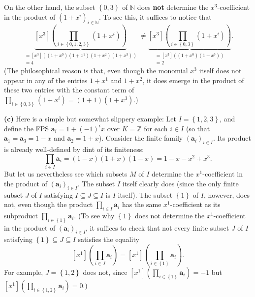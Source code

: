 \begin{example}
On the other hand, the subset $\left\{  0,3\right\}  $ of $\mathbb{N}$ does
\textbf{not} determine the $x^{3}$-coefficient in the product of $\left(
1+x^{i}\right)  _{i\in\mathbb{N}}$. To see this, it suffices to notice that%
\[
\underbrace{\left[  x^{3}\right]  \left(  \prod_{i\in\left\{  0,1,2,3\right\}
}\left(  1+x^{i}\right)  \right)  }_{\substack{=\left[  x^{3}\right]  \left(
\left(  1+x^{0}\right)  \left(  1+x^{1}\right)  \left(  1+x^{2}\right)
\left(  1+x^{3}\right)  \right)  \\=4}}\neq\underbrace{\left[  x^{3}\right]
\left(  \prod_{i\in\left\{  0,3\right\}  }\left(  1+x^{i}\right)  \right)
}_{\substack{=\left[  x^{3}\right]  \left(  \left(  1+x^{0}\right)  \left(
1+x^{3}\right)  \right)  \\=2}}.
\]
(The philosophical reason is that, even though the monomial $x^{3}$ itself
does not appear in any of the entries $1+x^{1}$ and $1+x^{2}$, it does emerge
in the product of these two entries with the constant term of $\prod
_{i\in\left\{  0,3\right\}  }\left(  1+x^{i}\right)  =\left(  1+1\right)
\left(  1+x^{3}\right)  $.) \medskip

\textbf{(c)} Here is a simple but somewhat slippery example: Let $I=\left\{
1,2,3\right\}  $, and define the FPS $\mathbf{a}_{i}=1+\left(  -1\right)
^{i}x$ over $K=\mathbb{Z}$ for each $i\in I$ (so that $\mathbf{a}%
_{1}=\mathbf{a}_{3}=1-x$ and $\mathbf{a}_{2}=1+x$). Consider the finite family
$\left(  \mathbf{a}_{i}\right)  _{i\in I}$. Its product is already
well-defined by dint of its finiteness:%
\[
\prod_{i\in I}\mathbf{a}_{i}=\left(  1-x\right)  \left(  1+x\right)  \left(
1-x\right)  =1-x-x^{2}+x^{3}.
\]
But let us nevertheless see which subsets $M$ of $I$ determine the $x^{1}%
$-coefficient in the product of $\left(  \mathbf{a}_{i}\right)  _{i\in I}$.
The subset $I$ itself clearly does (since the only finite subset $J$ of $I$
satisfying $I\subseteq J\subseteq I$ is $I$ itself). The subset $\left\{
1\right\}  $ of $I$, however, does not, even though the product $\prod_{i\in
I}\mathbf{a}_{i}$ has the same $x^{1}$-coefficient as its subproduct
$\prod_{i\in\left\{  1\right\}  }\mathbf{a}_{i}$. (To see why $\left\{
1\right\}  $ does not determine the $x^{1}$-coefficient in the product of
$\left(  \mathbf{a}_{i}\right)  _{i\in I}$, it suffices to check that not
every finite subset $J$ of $I$ satisfying $\left\{  1\right\}  \subseteq
J\subseteq I$ satisfies the equality%
\[
\left[  x^{1}\right]  \left(  \prod_{i\in J}\mathbf{a}_{i}\right)  =\left[
x^{1}\right]  \left(  \prod_{i\in\left\{  1\right\}  }\mathbf{a}_{i}\right)
.
\]
For example, $J=\left\{  1,2\right\}  $ does not, since $\left[  x^{1}\right]
\left(  \prod_{i\in\left\{  1\right\}  }\mathbf{a}_{i}\right)  =-1$ but
$\left[  x^{1}\right]  \left(  \prod_{i\in\left\{  1,2\right\}  }%
\mathbf{a}_{i}\right)  =0$.)


\end{example}
